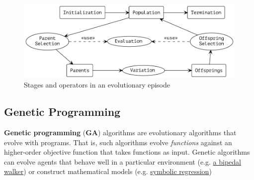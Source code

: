 \documentclass{article}
\begin{document}
\begin{figure}[h]
    \caption{Stages and operators in an evolutionary episode}
    \includegraphics[width=\textwidth]{ramen}    
    \centering
\end{figure}

\subsection{Genetic Programming}
\label{sec:genalg}
\textbf{Genetic programming} (\textbf{GA}) algorithms are evolutionary algorithms that evolve with programs. That is, such algorithms evolve \textit{functions} against an higher-order objective function that takes functions as input. Genetic algorithms can evolve agents that behave well in a particular environment (e.g. \href{https://www.mdpi.com/2227-7390/11/13/2931}{a bipedal walker}) or construct mathematical models (e.g. \href{https://link.springer.com/article/10.1007/s11831-023-09922-z}{symbolic regression})
\end{document}
